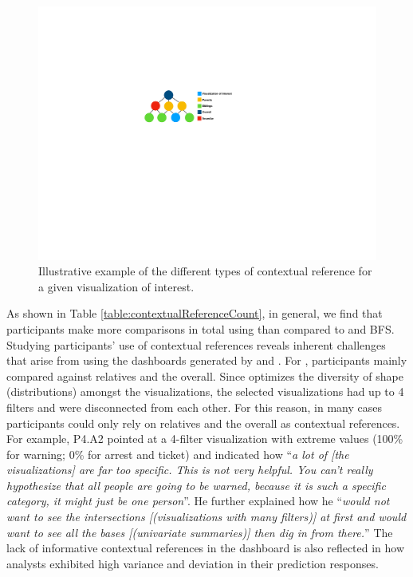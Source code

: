 \begin{figure}[h!]
\centering
\includegraphics[width=\linewidth]{figures/contextual_reference.pdf}
\caption{Illustrative example of the different types of contextual reference for a given visualization of interest.}
\label{fig:reference}
\end{figure}
As shown in Table \ref{table:contextualReferenceCount}, in general, we find that participants make more comparisons in total using \system than compared to \cluster and BFS. Studying participants' use of contextual references reveals inherent challenges that arise from using the dashboards generated by \BFS and \cluster. For \cluster , participants mainly compared against relatives and the overall. Since \cluster optimizes the diversity of shape (distributions) amongst the visualizations, the selected visualizations had up to 4 filters and were disconnected from each other. For this reason, in many cases participants could only rely on relatives and the overall as contextual references. For example, P4.A2 pointed at a 4-filter visualization with extreme values (100\% for warning; 0\% for arrest and ticket) and indicated how ``\textit{a lot of [the visualizations] are far too specific. This is not very helpful. You can't really hypothesize that all people are going to be warned, because it is such a specific category, it might just be one person}''. %
He further explained how he ``\textit{would not want to see the intersections [(visualizations with many filters)] at first and would want to see all the bases [(univariate summaries)] then dig in from there.}'' The lack of informative contextual references in the \cluster dashboard is also reflected in how analysts exhibited high variance and deviation in their prediction responses.
